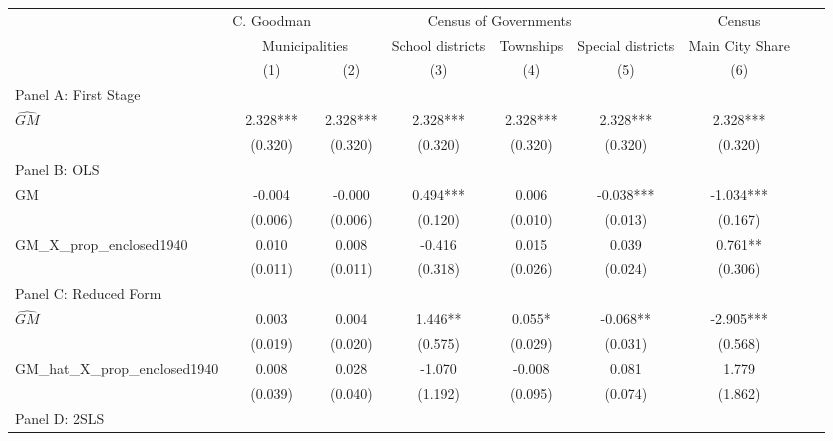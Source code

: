  \begin{tabular}{l*{8}{c}} \toprule
&\multicolumn{1}{c}{C. Goodman}&\multicolumn{4}{c}{Census of Governments}&\multicolumn{1}{c}{Census}\\\cmidrule(lr){2-2}\cmidrule(lr){3-6}\cmidrule(lr){7-7}
&\multicolumn{2}{c}{Municipalities}&\multicolumn{1}{c}{School districts}&\multicolumn{1}{c}{Townships}&\multicolumn{1}{c}{Special districts}&\multicolumn{1}{c}{Main City Share}\\\cmidrule(lr){2-3}\cmidrule(lr){4-6}\cmidrule(lr){7-7}
&\multicolumn{1}{c}{(1)}&\multicolumn{1}{c}{(2)}&\multicolumn{1}{c}{(3)}&\multicolumn{1}{c}{(4)}&\multicolumn{1}{c}{(5)}&\multicolumn{1}{c}{(6)}\\
\cmidrule(lr){1-7}
\multicolumn{6}{l}{Panel A: First Stage}\\
\cmidrule(lr){1-7}
$\widehat{GM}$  &    2.328***&    2.328***&    2.328***&    2.328***&    2.328***&    2.328***\\
                &  (0.320)   &  (0.320)   &  (0.320)   &  (0.320)   &  (0.320)   &  (0.320)   \\
\cmidrule(lr){1-7}
\multicolumn{6}{l}{Panel B: OLS}\\
\cmidrule(lr){1-7}
GM              &   -0.004   &   -0.000   &    0.494***&    0.006   &   -0.038***&   -1.034***\\
                &  (0.006)   &  (0.006)   &  (0.120)   &  (0.010)   &  (0.013)   &  (0.167)   \\
\addlinespace
GM\_X\_prop\_enclosed1940&    0.010   &    0.008   &   -0.416   &    0.015   &    0.039   &    0.761** \\
                &  (0.011)   &  (0.011)   &  (0.318)   &  (0.026)   &  (0.024)   &  (0.306)   \\
\cmidrule(lr){1-7}
\multicolumn{6}{l}{Panel C: Reduced Form}\\
\cmidrule(lr){1-7}
$\widehat{GM}$  &    0.003   &    0.004   &    1.446** &    0.055*  &   -0.068** &   -2.905***\\
                &  (0.019)   &  (0.020)   &  (0.575)   &  (0.029)   &  (0.031)   &  (0.568)   \\
\addlinespace
GM\_hat\_X\_prop\_enclosed1940&    0.008   &    0.028   &   -1.070   &   -0.008   &    0.081   &    1.779   \\
                &  (0.039)   &  (0.040)   &  (1.192)   &  (0.095)   &  (0.074)   &  (1.862)   \\
\cmidrule(lr){1-7}
\multicolumn{6}{l}{Panel D: 2SLS}\\

\end{tabular}
